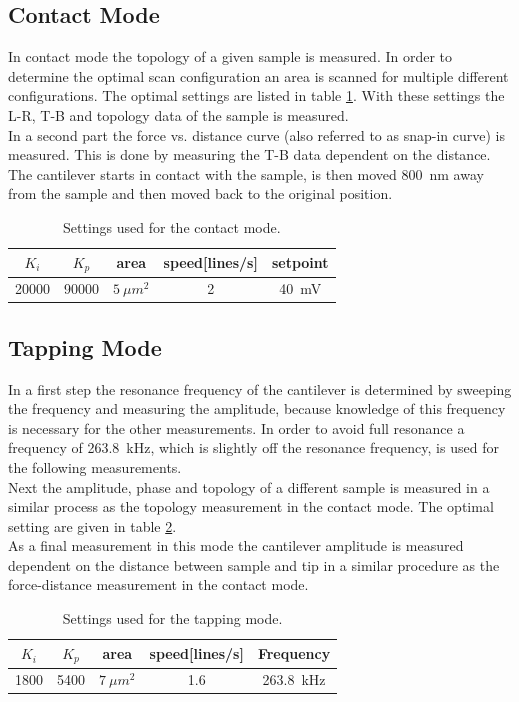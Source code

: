 \documentclass[%
 reprint,
amsmath,amssymb,
pra,
]{revtex4-1}
\begin{document}
\subsection{Contact Mode}
In contact mode the topology of a given sample is measured. In order to determine the optimal scan configuration an area is scanned for multiple different configurations. The optimal settings are listed in table \ref{tab:contact_settings}. With these settings the L-R, T-B and topology data of the sample is measured.\\
In a second part the force vs. distance curve (also referred to as snap-in curve) is measured. This is done by measuring the T-B data dependent on the distance. The cantilever starts in contact with the sample, is then moved \SI{800}{nm} away from the sample and then moved back to the original position.
\begin{table}[h]
\centering
\begin{tabular}{|c|c|c|c|c|}
\hline 
$K_i$ & $K_p$ & area & speed[lines/s] & setpoint\\ 
\hline 
20000 & 90000 & $\SI{5}{\mu m^2}$ & 2 & \SI{40}{mV}\\ 
\hline 
\end{tabular} 
\caption{Settings used for the contact mode.}
\label{tab:contact_settings}
\end{table}

\subsection{Tapping Mode}
In a first step the resonance frequency of the cantilever is determined by sweeping the frequency and measuring the amplitude, because knowledge of this frequency is necessary for the other measurements. In order to avoid full resonance a frequency of \SI{263.8}{kHz}, which is slightly off the resonance frequency, is used for the following measurements.\\
Next the amplitude, phase and topology of a different sample is measured in a similar process as the topology measurement in the contact mode. The optimal setting are given in table \ref{tab:tapping_settings}.\\
As a final measurement in this mode the cantilever amplitude is measured dependent on the distance between sample and tip in a similar procedure as the force-distance measurement in the contact mode. 
\begin{table}[h]
\centering
\begin{tabular}{|c|c|c|c|c|}
\hline 
$K_i$ & $K_p$ & area & speed[lines/s] & Frequency\\ 
\hline 
1800 & 5400 & $\SI{7}{\mu m^2}$ & 1.6 & \SI{263.8}{kHz}\\ 
\hline 
\end{tabular} 
\caption{Settings used for the tapping mode.}
\label{tab:tapping_settings}
\end{table}
\end{document}
